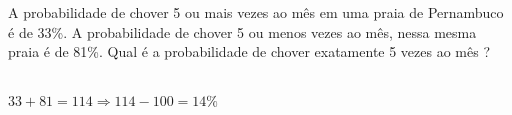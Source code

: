 \begin{ex}
 A probabilidade de chover 5 ou mais vezes ao mês em uma praia de Pernambuco é de 33\%. A probabilidade de chover 5 ou menos vezes ao mês, nessa mesma praia é de 81\%. Qual é a probabilidade de chover exatamente 5 vezes ao mês ?
   \begin{sol}
     \phantom{A}\\
     $33+81=114 \Longrightarrow 114-100=14\%$
   \end{sol}
\end{ex}